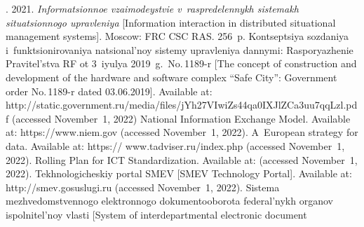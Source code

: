


 



  \begin{multicols}{2}

\renewcommand{\bibname}{\protect\rmfamily References}

{\small\frenchspacing
 {%
 \begin{thebibliography}{99}
. 2021. \textit{In\-for\-ma\-tsi\-on\-noe 
vza\-i\-mo\-dey\-st\-vie v~ras\-pre\-de\-len\-nykh sis\-te\-makh si\-tu\-a\-tsi\-on\-no\-go uprav\-le\-niya} 
[Information interaction in distributed situational management systems]. Moscow: 
FRC CSC RAS. 256~p. 
Kon\-tsep\-tsiya sozdaniya i~funk\-tsio\-ni\-ro\-va\-niya na\-tsi\-o\-nal'\-noy sis\-te\-my uprav\-le\-niya 
dan\-ny\-mi: Ras\-po\-rya\-zhe\-nie Pra\-vi\-tel'\-st\-va RF ot 3~iyulya 2019~g.\ No.\,1189-r [The 
concept of construction and development of the hardware and software complex 
``Safe City'': Government order No.\,1189-r dated 03.06.2019]. Available at: {\sf 
http://static.\linebreak government.ru/media/files/jYh27VIwiZs44qa0IXJlZCa\linebreak 3uu7qqLzl.pdf} (accessed November~1, 2022)
National Information Exchange Model. Available at: {\sf 
https://www.niem.gov} (accessed November~1, 2022).
A~European strategy for data. Available at: {\sf 
https:// www.tadviser.ru/index.php} (accessed November~1, 2022).
Rolling Plan for ICT Standardization. Available at: (accessed November~1, 2022).
Tekhnologicheskiy portal SMEV [SMEV Technology Portal]. Available at:  {\sf 
http://smev.gosuslugi.ru} (accessed November~1, 2022).
Sis\-te\-ma mezh\-ve\-dom\-st\-ven\-no\-go elekt\-ron\-no\-go do\-ku\-men\-to\-obo\-ro\-ta fe\-de\-ral'\-nykh 
or\-ga\-nov is\-pol\-ni\-tel'\-noy vlas\-ti [System of interdepartmental electronic document 

\end{thebibliography}}}
\end{multicols}
